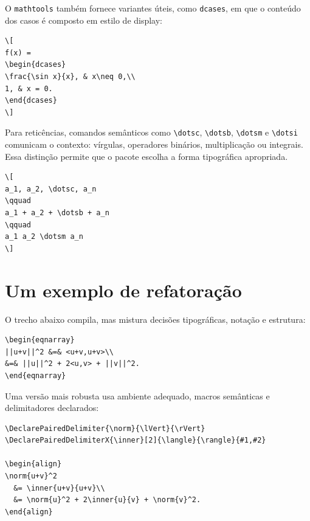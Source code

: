 O \texttt{mathtools} também fornece variantes úteis, como \texttt{dcases}, em que o conteúdo dos casos é composto em estilo de display:

\begin{lstlisting}[language={[latex]TeX}, caption={Casos em estilo de display}]
\[
f(x) =
\begin{dcases}
\frac{\sin x}{x}, & x\neq 0,\\
1, & x = 0.
\end{dcases}
\]
\end{lstlisting}

Para reticências, comandos semânticos como \verb|\dotsc|, \verb|\dotsb|, \verb|\dotsm| e \verb|\dotsi| comunicam o contexto: vírgulas, operadores binários, multiplicação ou integrais. Essa distinção permite que o pacote escolha a forma tipográfica apropriada.

\begin{lstlisting}[language={[latex]TeX}, caption={Reticências semânticas}]
\[
a_1, a_2, \dotsc, a_n
\qquad
a_1 + a_2 + \dotsb + a_n
\qquad
a_1 a_2 \dotsm a_n
\]
\end{lstlisting}

\section{Um exemplo de refatoração}

O trecho abaixo compila, mas mistura decisões tipográficas, notação e estrutura:

\begin{lstlisting}[language={[latex]TeX}, caption={Trecho matemático frágil}]
\begin{eqnarray}
||u+v||^2 &=& <u+v,u+v>\\
&=& ||u||^2 + 2<u,v> + ||v||^2.
\end{eqnarray}
\end{lstlisting}

Uma versão mais robusta usa ambiente adequado, macros semânticas e delimitadores declarados:

\begin{lstlisting}[language={[latex]TeX}, caption={Trecho refatorado}]
\DeclarePairedDelimiter{\norm}{\lVert}{\rVert}
\DeclarePairedDelimiterX{\inner}[2]{\langle}{\rangle}{#1,#2}

\begin{align}
\norm{u+v}^2
  &= \inner{u+v}{u+v}\\
  &= \norm{u}^2 + 2\inner{u}{v} + \norm{v}^2.
\end{align}
\end{lstlisting}


